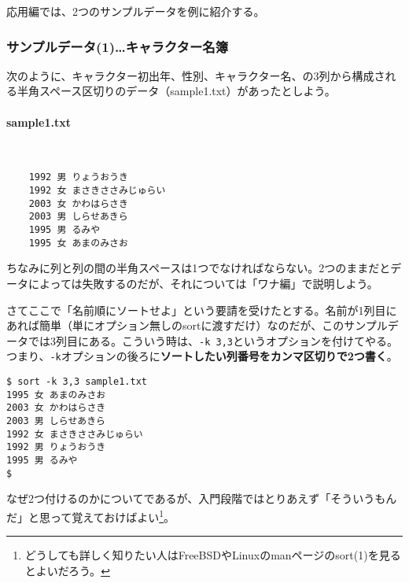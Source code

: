 応用編では、2つのサンプルデータを例に紹介する。

\subsubsection*{サンプルデータ(1)…キャラクター名簿}

次のように、キャラクター初出年、性別、キャラクター名、の3列から構成される半角スペース区切りのデータ（sample1.txt）があったとしよう。
\paragraph{sample1.txt}　\\
\begin{frameboxit}{160.0mm}
\begin{verbatim}
	1992 男 りょうおうき
	1992 女 まさきささみじゅらい
	2003 女 かわはらさき
	2003 男 しらせあきら
	1995 男 るみや
	1995 女 あまのみさお
\end{verbatim}
\end{frameboxit}

ちなみに列と列の間の半角スペースは1つでなければならない。2つのままだとデータによっては失敗するのだが、それについては「ワナ編」で説明しよう。

さてここで「名前順にソートせよ」という要請を受けたとする。名前が1列目にあれば簡単（単にオプション無しのsortに渡すだけ）なのだが、このサンプルデータでは3列目にある。こういう時は、\verb|-k 3,3|というオプションを付けてやる。つまり、\verb|-k|オプションの後ろに\textbf{ソートしたい列番号をカンマ区切りで2つ書く}。
\begin{screen}
	\verb!$ sort -k 3,3 sample1.txt! \return \\
	\verb!1995 女 あまのみさお! \\
	\verb!2003 女 かわはらさき! \\
	\verb!2003 男 しらせあきら! \\
	\verb!1992 女 まさきささみじゅらい! \\
	\verb!1992 男 りょうおうき! \\
	\verb!1995 男 るみや! \\
	\verb!$ !
\end{screen}

なぜ2つ付けるのかについてであるが、入門段階ではとりあえず「そういうもんだ」と思って覚えておけばよい\footnote{どうしても詳しく知りたい人はFreeBSDやLinuxのmanページのsort(1)を見るとよいだろう。}。

